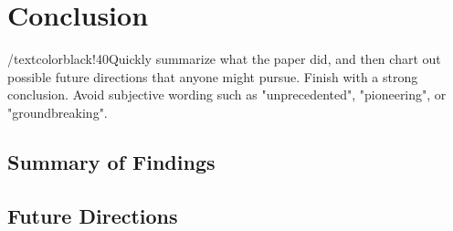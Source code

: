 
\section{Conclusion}\label{sec:Conclusion}
/textcolor{black!40}{Quickly summarize what the paper did, and then chart out possible future directions that anyone might pursue. Finish with a strong conclusion. Avoid subjective wording such as "unprecedented", "pioneering", or "groundbreaking".}
\subsection{Summary of Findings}
\textcolor{black!30}{\lipsum[63-64]}

\subsection{Future Directions}
\textcolor{black!30}{\lipsum[65]}

